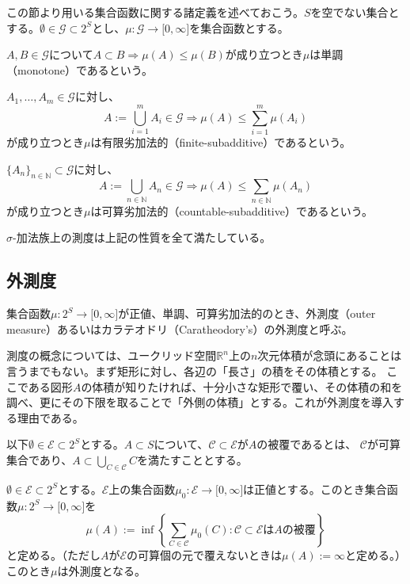 \documentclass[../root.tex]{subfiles}
\begin{document}
この節より用いる集合函数に関する諸定義を述べておこう。$ S $を空でない集合とする。$ \emptyset\in\mathscr{G}\subset 2^{S} $とし、$ \mu\colon\mathscr{G}\rightarrow\lbrack 0, \infty \rbrack $を集合函数とする。
\begin{EnumCond}
\item $ A, B\in\mathscr{G} $について$ A\subset B \Rightarrow \mu( A )\le\mu( B ) $が成り立つとき$ \mu $は単調（monotone）であるという。
\item $ A_{1}, \dotsc, A_{m}\in\mathscr{G} $に対し、
\[ A:=\bigcup_{i=1}^{m}A_{i}\in\mathscr{G} \Rightarrow \mu( A )\le\sum_{i=1}^{m}\mu( A_{i} ) \]
が成り立つとき$ \mu $は有限劣加法的（finite-subadditive）であるという。
\item $ \lbrace A_{n} \rbrace_{n\in\mathbb{N}}\subset\mathscr{G} $に対し、
\[ A:=\bigcup_{n\in\mathbb{N}} A_{n}\in\mathscr{G} \Rightarrow \mu( A )\le\sum_{n\in\mathbb{N}}\mu( A_{n} ) \]
が成り立つとき$ \mu $は可算劣加法的（countable-subadditive）であるという。
\end{EnumCond}

$ \sigma $-加法族上の測度は上記の性質を全て満たしている。




\subsection{外測度}
\begin{Def}{}{}
集合函数$ \mu\colon 2^{S}\rightarrow\lbrack 0, \infty \rbrack $が正値、単調、可算劣加法的のとき、外測度（outer measure）あるいはカラテオドリ（Caratheodory's）の外測度と呼ぶ。
\end{Def}

測度の概念については、ユークリッド空間$ \mathbb{R}^{n} $上の$ n $次元体積が念頭にあることは言うまでもない。まず矩形に対し、各辺の「長さ」の積をその体積とする。
ここである図形$ A $の体積が知りたければ、十分小さな矩形で覆い、その体積の和を調べ、更にその下限を取ることで「外側の体積」とする。これが外測度を導入する理由である。

以下$ \emptyset\in\mathscr{E}\subset 2^{S} $とする。$ A\subset S $について、$ \mathscr{C}\subset\mathscr{E} $が$ A $の被覆であるとは、
$ \mathscr{C} $が可算集合であり、$ A\subset\bigcup_{C\in\mathscr{C}}C $を満たすこととする。

\begin{Lem}{}{}
$ \emptyset\in\mathscr{E}\subset 2^{S} $とする。$ \mathscr{E} $上の集合函数$ \mu_{0}\colon\mathscr{E}\rightarrow\lbrack 0, \infty \rbrack $は正値とする。このとき集合函数$ \mu\colon 2^{S}\rightarrow\lbrack 0, \infty \rbrack $を
\[ \mu( A ):=\inf\left\lbrace \sum_{C\in\mathscr{C}}\mu_{0}( C ) : \mathscr{C}\subset\mathscr{E}\text{は}A\text{の被覆} \right\rbrace \]
と定める。（ただし$ A $が$ \mathscr{E} $の可算個の元で覆えないときは$ \mu( A ):=\infty $と定める。）このとき$ \mu $は外測度となる。
\end{Lem}
\end{document}
